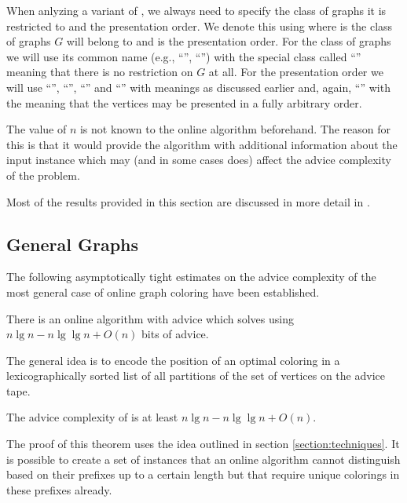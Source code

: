 When anlyzing a variant of , we always need to
specify the class of graphs it is restricted to and the presentation
order. We denote this using  where  is the class
of graphs $G$ will belong to and  is the presentation order.
For the class of graphs we will use its common name (e.g.,
``'', ``'') with the special class
called ``'' meaning that there is no restriction on $G$ at
all. For the presentation order we will use ``'',
``'', ``'' and ``'' with
meanings as discussed earlier and, again, ``'' with the
meaning that the vertices may be presented in a fully arbitrary order.

The value of $n$ is not known to the online algorithm beforehand. The
reason for this is that it would provide the algorithm with additional
information about the input instance which may (and in some cases does)
affect the advice complexity of the problem.

Most of the results provided in this section are discussed in more detail
in \cite{misof-trivial-graphs}.


\subsection{General Graphs}

The following asymptotically tight estimates on the advice complexity of
the most general case of online graph coloring have been established.

\begin{theorem}\label{theorem:general-graphs-upper}
    There is an online algorithm with advice which solves
     using $n \lg n - n \lg\lg n + O(n)$ bits of
    advice.
\end{theorem}

The general idea is to encode the position of an optimal coloring in a
lexicographically sorted list of all partitions of the set of vertices on
the advice tape.

\begin{theorem}\label{theorem:general-graphs-lower}
    The advice complexity of  is at least $n \lg n - n
    \lg\lg n + O(n)$.
\end{theorem}

The proof of this theorem uses the idea outlined in section
\ref{section:techniques}. It is possible to create a set of instances that
an online algorithm cannot distinguish based on their prefixes up to a
certain length but that require unique colorings in these prefixes
already.

